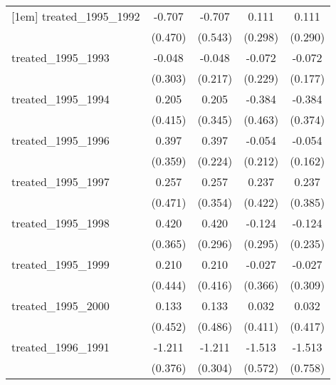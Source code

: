 {\begin{tabular}{l*{4}{c}}
[1em]
treated\_1995\_1992&      -0.707         &      -0.707         &       0.111         &       0.111         \\
            &     (0.470)         &     (0.543)         &     (0.298)         &     (0.290)         \\
[1em]
treated\_1995\_1993&      -0.048         &      -0.048         &      -0.072         &      -0.072         \\
            &     (0.303)         &     (0.217)         &     (0.229)         &     (0.177)         \\
[1em]
treated\_1995\_1994&       0.205         &       0.205         &      -0.384         &      -0.384         \\
            &     (0.415)         &     (0.345)         &     (0.463)         &     (0.374)         \\
[1em]
treated\_1995\_1996&       0.397         &       0.397         &      -0.054         &      -0.054         \\
            &     (0.359)         &     (0.224)         &     (0.212)         &     (0.162)         \\
[1em]
treated\_1995\_1997&       0.257         &       0.257         &       0.237         &       0.237         \\
            &     (0.471)         &     (0.354)         &     (0.422)         &     (0.385)         \\
[1em]
treated\_1995\_1998&       0.420         &       0.420         &      -0.124         &      -0.124         \\
            &     (0.365)         &     (0.296)         &     (0.295)         &     (0.235)         \\
[1em]
treated\_1995\_1999&       0.210         &       0.210         &      -0.027         &      -0.027         \\
            &     (0.444)         &     (0.416)         &     (0.366)         &     (0.309)         \\
[1em]
treated\_1995\_2000&       0.133         &       0.133         &       0.032         &       0.032         \\
            &     (0.452)         &     (0.486)         &     (0.411)         &     (0.417)         \\
[1em]
treated\_1996\_1991&      -1.211\sym{**} &      -1.211\sym{***}&      -1.513\sym{**} &      -1.513\sym{*}  \\
            &     (0.376)         &     (0.304)         &     (0.572)         &     (0.758)         \\

\end{tabular}}
